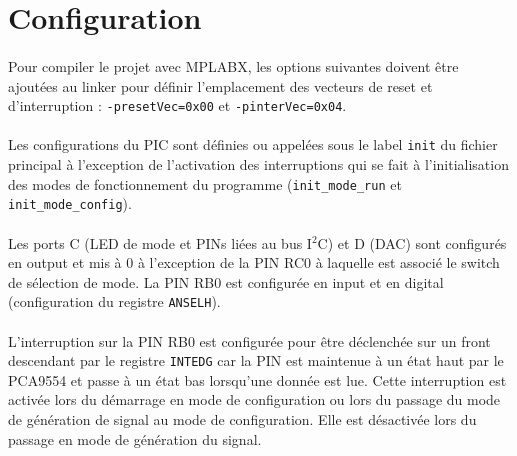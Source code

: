 \documentclass{article}
\begin{document}




    \section{Configuration}
    \paragraph{}
    Pour compiler le projet avec MPLABX, les options suivantes doivent être ajoutées au linker pour définir l'emplacement des vecteurs de reset et d'interruption : \texttt{-presetVec=0x00} et \texttt{-pinterVec=0x04}.

    \paragraph{}
    Les configurations du PIC sont définies ou appelées sous le label \texttt{init} du fichier principal à l'exception de l'activation des interruptions qui se fait à l'initialisation des modes de fonctionnement du programme (\texttt{init\_mode\_run} et \texttt{init\_mode\_config}).

    \paragraph{}
    Les ports C (LED de mode et PINs liées au bus I$^2$C) et D (DAC) sont configurés en output et mis à 0 à l'exception de la PIN RC0 à laquelle est associé le switch de sélection de mode. La PIN RB0 est configurée en input et en digital (configuration du registre \texttt{ANSELH}).

    \paragraph{}
    L'interruption sur la PIN RB0 est configurée pour être déclenchée sur un front descendant par le registre \texttt{INTEDG} car la PIN est maintenue à un état haut par le PCA9554 et passe à un état bas lorsqu'une donnée est lue. Cette interruption est activée lors du démarrage en mode de configuration ou lors du passage du mode de génération de signal au mode de configuration. Elle est désactivée lors du passage en mode de génération du signal.
 
\end{document}
